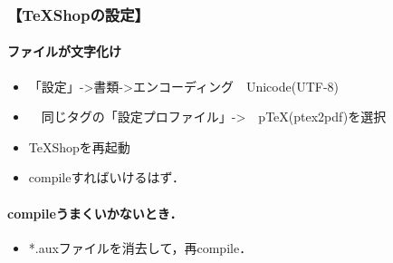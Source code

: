 \subsubsection{【TeXShopの設定】}
\paragraph{ファイルが文字化け}\begin{itemize}
\item 「設定」->書類->エンコーディング　Unicode(UTF-8)
\item 　同じタグの「設定プロファイル」->　pTeX(ptex2pdf)を選択
\item TeXShopを再起動
\item compileすればいけるはず．
\end{itemize}
\paragraph{compileうまくいかないとき．}\begin{itemize}
\item *.auxファイルを消去して，再compile．
\end{itemize}
